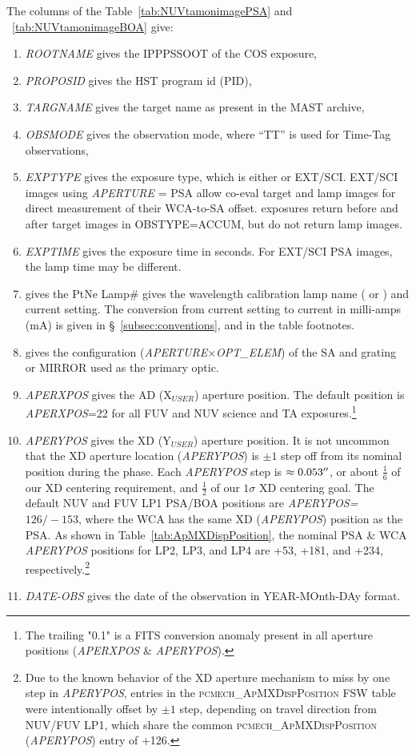 The columns of the Table~\ref{tab:NUVtamonimagePSA} and ~\ref{tab:NUVtamonimageBOA} give:
\footnotesize
\begin{enumerate}
\item \textit{ROOTNAME} gives the IPPPSSOOT of the COS exposure,
\item \textit{PROPOSID} gives the HST program id (PID),
\item \textit{TARGNAME} gives the target name as present in the MAST archive,
\item \textit{OBSMODE} gives the observation mode, where ``TT'' is used for Time-Tag observations,
\item \textit{EXPTYPE} gives the exposure type, which is either  or EXT/SCI. EXT/SCI images using \textit{APERTURE} = PSA allow co-eval target and lamp images for
direct measurement of their WCA-to-SA offset.  exposures return before and after target images in \textsc{OBSTYPE}=ACCUM, but do not return lamp images.
\item \textit{EXPTIME} gives the exposure time in seconds. For EXT/SCI PSA images, the lamp time may be different.
\item gives the PtNe Lamp\# gives the wavelength calibration lamp name (\plampone{} or \plamptwo{}) and current setting. The conversion from current setting to current in milli-amps (mA) is given in \S~\ref{subsec:conventions}, and in the table footnotes.
\item gives the configuration (\textit{APERTURE}$\times$\textit{OPT\_ELEM}) of the SA and grating or MIRROR used as the primary optic.
\item \textit{APERXPOS} gives the AD (X$_{USER}$) aperture position. The default position is \textit{APERXPOS}=22 for all FUV and NUV science and TA exposures.\footnote{The trailing "0.1" is a FITS conversion anomaly present in all aperture positions (\textit{APERXPOS} \& \textit{APERYPOS}).}
\item \textit{APERYPOS} gives the XD (Y$_{USER}$) aperture position. It is not uncommon that the XD aperture location (\textit{APERYPOS}) is $\pm 1$ step off from its nominal position during the  phase. Each \textit{APERYPOS} step is $\approx0.053\hbox{$^{\prime\prime}$}$, or about $\frac{1}{6}$ of
our XD centering requirement, and $\frac{1}{2}$ of our $1\sigma$ XD centering goal. The default NUV and FUV LP1 PSA/BOA positions are \textit{APERYPOS=$126/-153$}, where the WCA has the same XD (\textit{APERYPOS}) position as the PSA.
As shown in Table~\ref{tab:ApMXDispPosition}, the nominal PSA \& WCA \textit{APERYPOS} positions for LP2, LP3, and LP4 are +53, +181, and +234, respectively.\footnote{Due
to the known behavior of the XD aperture mechanism to miss by one step in \textit{APERYPOS}, entries in the \textsc{pcmech\_ApMXDispPosition} FSW table were intentionally offset by $\pm 1$ step, depending on travel direction from NUV/FUV LP1, which
share the common \textsc{pcmech\_ApMXDispPosition} (\textit{APERYPOS}) entry of +126.}
\item \textit{DATE-OBS} gives the date of the observation in YEAR-MOnth-DAy format.
\end{enumerate}
\normalsize

